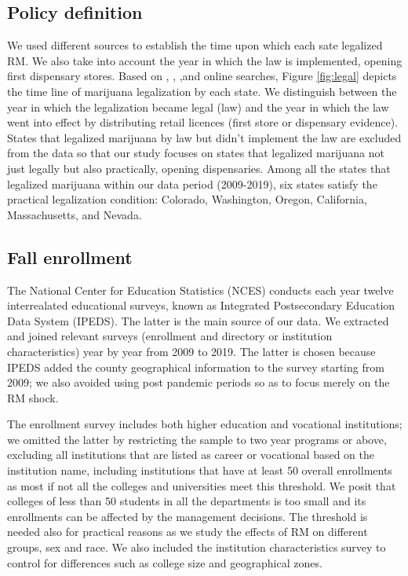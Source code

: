 \documentclass[12pt]{article}%
\begin{document}
\subsection{Policy definition}

We used different sources to establish the time upon which each sate legalized RM. We also take into account the year in which the law is implemented, opening first dispensary stores. Based on \cite{kinaSUR}, \cite{mpp}, \cite{kim2020retail} ,and online searches,  Figure \ref{fig:legal} depicts the time line of marijuana legalization by each state. We distinguish between the year in which the legalization became legal (law) and the year in which the law went into effect by distributing retail licences (first store or dispensary evidence). States that legalized marijuana by law but didn't implement the law are excluded from the data so that our study focuses on states that legalized marijuana not just legally but also practically, opening dispensaries.
Among all the states that legalized marijuana within our data period (2009-2019), six states satisfy the practical legalization condition: Colorado, Washington, Oregon, California, Massachusetts, and Nevada.

\subsection{Fall enrollment}
The National Center for Education Statistics (NCES) conducts each year twelve interrealated educational surveys, known as Integrated Postsecondary Education Data System (IPEDS). The latter is the main source of our data. We extracted and joined relevant surveys (enrollment and directory or institution characteristics) year by year from 2009 to 2019. The latter is chosen because IPEDS added the county geographical information to the survey starting from 2009; we also avoided using post pandemic periods so as to focus merely on the RM shock. 

The enrollment survey \cite{ipeds} includes both higher education and vocational institutions; we omitted the latter by restricting the sample to two year programs or above, excluding all institutions that are listed as career or vocational based on the institution name, including institutions that have at least 50 overall enrollments as most if not all the colleges and universities meet this threshold. We posit that colleges of less than 50 students in all the departments is too small and its enrollments can be affected by the management decisions. The threshold is needed also for practical reasons as we study the effects of RM on different groups, sex and race.  We also included the institution characteristics survey to control for differences such as college size and geographical zones.
\end{document}
